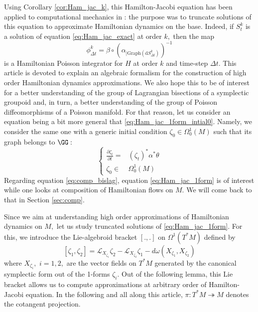 \documentclass[a4paper,11pt]{article}
\newcommand{\Graph}{\text{Graph}}
\begin{document}
Using Corollary \ref{cor:Ham_jac_k}, this Hamilton-Jacobi equation has been applied to computational mechanics in \cite{Oscar2022}: the purpose was to truncate solutions of this equation to approximate Hamiltonian dynamics on the base. Indeed, if $S_t^k$ is a solution of equation \eqref{eq:Ham_jac_exact} at order $k,$ then the map
\[
\phi_{\Delta t}^k = \beta \circ \left( \alpha_{| \Graph(\text{d} S_{\Delta t}^k)} \right)^{-1}
\]
is a Hamiltonian Poisson integrator for $H$ at order $k$ and time-step $\Delta t.$ This article is devoted to explain an algebraic formalism for the construction of high order Hamiltonian dynamics approximations. We also hope this to be of interest for a better understanding of the group of Lagrangian bisections of a symplectic groupoid and, in turn, a better understanding of the group of Poisson diffeomorphisms of a Poisson manifold. For that reason, let us consider an equation being a bit more general that \eqref{eq:Ham_jac_1form_intial0}. Namely, we consider the same one with a generic initial condition $\zeta_0 \in  \Omega^1_0(M)$ such that its graph belongs to $\GG:$
\begin{equation}\label{eq:Ham_jac_1form}
\left\{
\begin{array}{cc}
\frac{\partial \zeta_t}{\partial t} =& (\zeta_t)^*\alpha^*\theta\\
\zeta_0 \in&  \Omega^1_0(M)
\end{array}
\right.
\end{equation}
Regarding equation \eqref{eq:comp_bislag}, equation \eqref{eq:Ham_jac_1form} is of interest while one looks at composition of Hamiltonian flows on $M.$ We will come back to that in Section \ref{sec:comp}.

Since we aim at understanding high order approximations of Hamiltonian dynamics on $M,$ let us study truncated solutions of \eqref{eq:Ham_jac_1form}. For this, we introduce the Lie-algebroid bracket $[.,.]$ on $\Omega^1(T^*M)$ defined by
\[
[ \zeta_1, \zeta_2] = \mathcal{L}_{X_{\zeta_1}}\zeta_2 - \mathcal{L}_{X_{\zeta_2}}\zeta_1 - d \omega(X_{\zeta_1}, X_{\zeta_2})
\]
where $X_{\zeta_i},$ $i = 1,2,$ are the vector fields on $T^*M$ generated by the canonical symplectic form out of the 1-forms $\zeta_i.$ Out of the following lemma, this Lie bracket allows us to compute approximations at arbitrary order of Hamilton-Jacobi equation. In the following and all along this article, $\pi \colon T^*M \twoheadrightarrow M$ denotes the cotangent projection.
\end{document}
